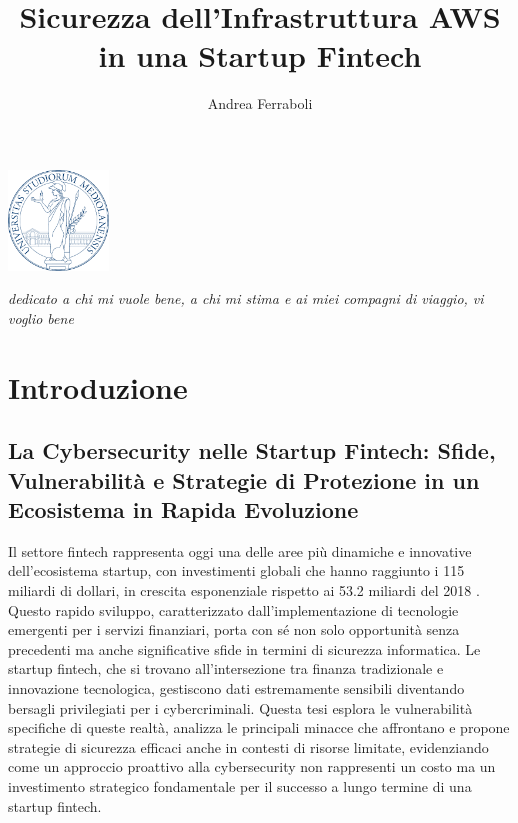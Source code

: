 \documentclass[a4paper,12pt]{report}
\begin{document}
\begin{center}
        \includegraphics[width=0.2\textwidth]{images/Unimi-logo.png}
        \vspace{1cm}
\end{center}

\title{Sicurezza dell'Infrastruttura AWS in una Startup Fintech}
\author{Andrea Ferraboli}

\beforepreface

{\hfill \Large {\sl dedicato a chi mi vuole bene, a chi mi stima e ai miei compagni di viaggio, vi voglio bene}}

\tableofcontents
\chapter{Introduzione}

\section{La Cybersecurity nelle Startup Fintech: Sfide, Vulnerabilità e Strategie di Protezione in un Ecosistema in Rapida Evoluzione}

Il settore fintech rappresenta oggi una delle aree più dinamiche e innovative dell'ecosistema startup, con investimenti globali che hanno raggiunto i 115 miliardi di dollari, in crescita esponenziale rispetto ai 53.2 miliardi del 2018 \cite{gartnerFintech}. Questo rapido sviluppo, caratterizzato dall'implementazione di tecnologie emergenti per i servizi finanziari, porta con sé non solo opportunità senza precedenti ma anche significative sfide in termini di sicurezza informatica. Le startup fintech, che si trovano all'intersezione tra finanza tradizionale e innovazione tecnologica, gestiscono dati estremamente sensibili diventando bersagli privilegiati per i cybercriminali. Questa tesi esplora le vulnerabilità specifiche di queste realtà, analizza le principali minacce che affrontano e propone strategie di sicurezza efficaci anche in contesti di risorse limitate, evidenziando come un approccio proattivo alla cybersecurity non rappresenti un costo ma un investimento strategico fondamentale per il successo a lungo termine di una startup fintech.
\end{document}
